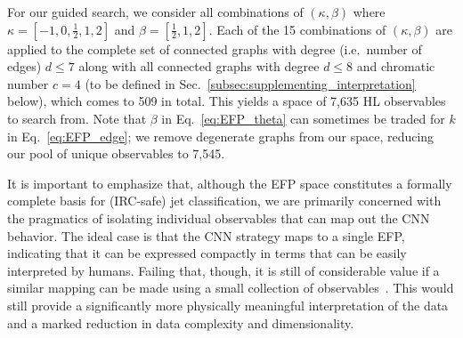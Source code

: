 \documentclass[aps,prd,twocolumn,superscriptaddress,preprintnumbers,nofootinbib,longbibliography,floatfix]{revtex4-1}
\newcommand{\Sec}[1]{Sec.~\ref{#1}}
\newcommand{\Eq}[1]{Eq.~\eqref{#1}}
\begin{document}
For our guided search, we consider all combinations of $(\kappa, \beta)$ where $\kappa = [-1, 0, \frac{1}{2}, 1, 2]$ and $\beta=[\frac{1}{2}, 1, 2]$. Each of the 15 combinations of $(\kappa, \beta)$ are applied to the complete set of connected graphs with degree (i.e.\ number of edges) $d \leq 7$ along with all connected graphs with degree $d\leq 8$ and chromatic number $c = 4$ (to be defined in \Sec{subsec:supplementing_interpretation} below), which comes to 509 in total. This yields a space of 7,635 HL observables to search from. Note that $\beta$ in \Eq{eq:EFP_theta} can sometimes be traded for $k$ in \Eq{eq:EFP_edge}; we remove degenerate graphs from our space, reducing our pool of unique observables to 7,545.

It is important to emphasize that, although the EFP space constitutes a formally complete basis for (IRC-safe) jet classification, we are primarily concerned with the pragmatics of isolating individual observables that can map out the CNN behavior. The ideal case is that the CNN strategy maps to a single EFP, indicating that it can be expressed compactly in terms that can be easily interpreted by humans. Failing that, though, it is still of considerable value if a similar mapping can be made using a small collection of observables~\cite{Datta:2017rhs,Moore:2018lsr,Aguilar-Saavedra:2020sxp}. This would still provide a significantly more physically meaningful interpretation of the data and a marked reduction in data complexity and dimensionality.
\end{document}
